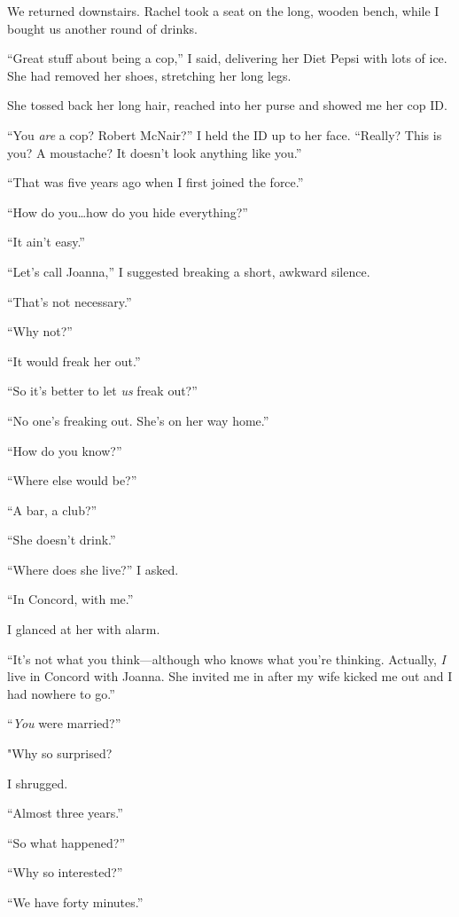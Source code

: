 We returned downstairs. Rachel took a seat on the long, wooden bench,
while I bought us another round of drinks.

``Great stuff about being a cop,'' I said, delivering her Diet Pepsi
with lots of ice. She had removed her shoes, stretching her long legs.

She tossed back her long hair, reached into her purse and showed me her
cop ID.

``You \emph{are} a cop? Robert McNair?'' I held the ID up to her face.
``Really? This is you? A moustache? It doesn't look anything like you.''

``That was five years ago when I first joined the force.''

``How do you\ldots how do you hide everything?''

``It ain't easy.''

``Let's call Joanna,'' I suggested breaking a short, awkward silence.

``That's not necessary.''

``Why not?''

``It would freak her out.''

``So it's better to let \emph{us} freak out?''

``No one's freaking out. She's on her way home.''

``How do you know?''

``Where else would be?''

``A bar, a club?''

``She doesn't drink.''

``Where does she live?'' I asked.

``In Concord, with me.''

I glanced at her with alarm.

``It's not what you think---although who knows what you're thinking.
Actually, \emph{I} live in Concord with Joanna. She invited me in after
my wife kicked me out and I had nowhere to go.''

``\emph{You} were married?''

"Why so surprised?

I shrugged.

``Almost three years.''

``So what happened?''

``Why so interested?''

``We have forty minutes.''

